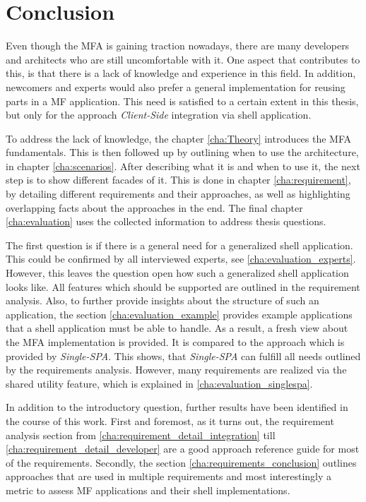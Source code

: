 
\chapter{Conclusion}\label{cha:conclusion}

Even though the \acf{MFA} is gaining traction nowadays, there are many developers and architects who are still uncomfortable with it.
One aspect that contributes to this, is that there is a lack of knowledge and experience in this field.
In addition, newcomers and experts would also prefer a general implementation for reusing parts in a \ac{MF} application.
This need is satisfied to a certain extent in this thesis, but only for the approach \textit{Client-Side} integration via shell application.


To address the lack of knowledge, the chapter \ref{cha:Theory} introduces the \ac{MFA} fundamentals.
This is then followed up by outlining when to use the architecture, in chapter \ref{cha:scenarios}.
After describing what it is and when to use it, the next step is to show different facades of it.
This is done in chapter \ref{cha:requirement}, by detailing different requirements and their approaches, as well as highlighting overlapping facts about the approaches in the end.
The final chapter \ref{cha:evaluation} uses the collected information to address thesis questions.

The first question is if there is a general need for a generalized shell application.
This could be confirmed by all interviewed experts, see \ref{cha:evaluation_experts}.
However, this leaves the question open how such a generalized shell application looks like.
All features which should be supported are outlined in the requirement analysis.
Also, to further provide insights about the structure of such an application, the section \ref{cha:evaluation_example} provides example applications that a shell application must be able to handle.
As a result, a fresh view about the \ac{MFA} implementation is provided.
It is compared to the approach which is provided by \textit{Single-SPA}.
This shows, that \textit{Single-SPA} can fulfill all needs outlined by the requirements analysis. 
However, many requirements are realized via the shared utility feature, which is explained in \ref{cha:evaluation_singlespa}.

In addition to the introductory question, further results have been identified in the course of this work.
First and foremost, as it turns out, the requirement analysis section from \ref{cha:requirement_detail_integration} till \ref{cha:requirement_detail_developer} are a good approach reference guide for most of the requirements.
Secondly, the section \ref{cha:requirements_conclusion} outlines approaches that are used in multiple requirements and most interestingly a metric to assess \ac{MF} applications and their shell implementations.

